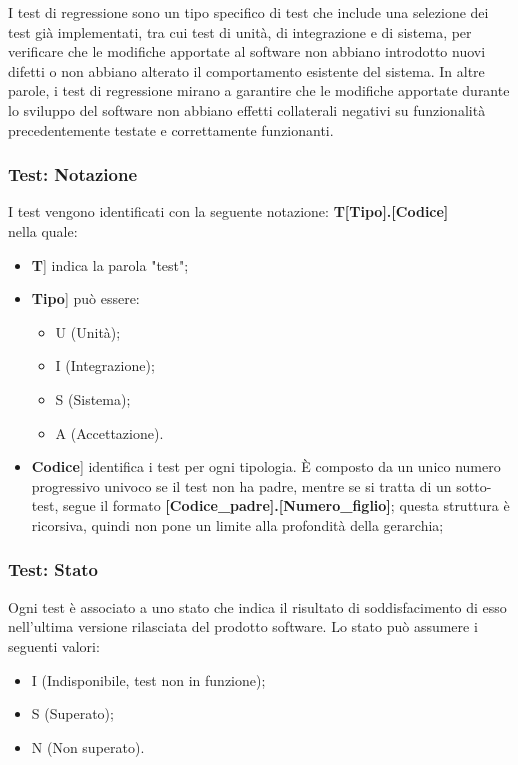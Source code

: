 \documentclass[10pt, a4paper]{article}
\begin{document}
I test di regressione sono un tipo specifico di test che include una selezione dei test già implementati, tra cui test di unità, di integrazione e di sistema, per verificare che le modifiche apportate al software non abbiano introdotto nuovi difetti o non abbiano alterato il comportamento esistente del sistema. In altre parole, i test di regressione mirano a garantire che le modifiche apportate durante lo sviluppo del software non abbiano effetti collaterali negativi su funzionalità precedentemente testate e correttamente funzionanti.

\subsubsection{Test: Notazione}
I test vengono identificati con la seguente notazione:
\textbf{T[Tipo].[Codice]}\\
nella quale:
\begin{itemize}
\item \lbrack \textbf{T}] indica la parola "test";
\item \lbrack \textbf{Tipo}] può essere:
    \begin{itemize}
	    \item U (Unità);
	    \item I (Integrazione);
	    \item S (Sistema);
        \item A (Accettazione).
    \end{itemize}
\item \lbrack \textbf{Codice}] identifica i test per ogni tipologia. È composto da un unico numero progressivo univoco se il test non ha padre, mentre se si tratta di un sotto-test, segue il formato \textbf{[Codice\_padre].[Numero\_figlio]}; questa struttura è ricorsiva, quindi non pone un limite alla profondità della gerarchia;
\end{itemize}

\subsubsection{Test: Stato}
Ogni test è associato a uno stato che indica il risultato di soddisfacimento di esso nell'ultima versione rilasciata del prodotto software. Lo stato può assumere i seguenti valori:
\begin{itemize}
    \item I (Indisponibile, test non in funzione);
    \item S (Superato);
    \item N (Non superato).
\end{itemize}
\end{document}
